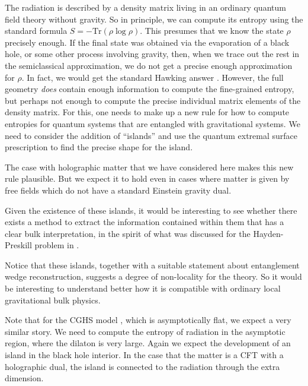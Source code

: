 \documentclass[12pt]{article}
\begin{document}
The radiation is described by a density matrix living in an ordinary quantum field theory without gravity. 
So in principle, we can compute its entropy using the standard formula $S = - \text{Tr}(\rho \log \rho)$. 
This presumes that we know the state $\rho$ precisely enough. 
If the final state was obtained via the evaporation of a black hole, or some other process involving gravity, then, when we trace out the rest in the semiclassical approximation, we do not get a precise enough approximation for $\rho$. 
In fact, we would get the standard Hawking answer \cite{Hawking:1976ra}. 
However, the full geometry {\it does} contain enough information to compute the fine-grained entropy, but perhaps not enough to compute the precise individual matrix elements of the density matrix. 
For this, one needs to make up a new rule for how to compute entropies for quantum systems that are entangled with gravitational systems. 
We need to consider the addition of ``islands'' and use the quantum extremal surface prescription  \cite{Ryu:2006bv,Hubeny:2007xt,Engelhardt:2014gca} to find the precise shape for the island. 
 
The case with holographic matter that we have considered here makes this new rule plausible. 
But we expect it to hold even in cases where matter is given by free fields which do not have a standard Einstein gravity dual. 

Given the existence of these islands, it would be interesting to see whether there exists a method   to extract the information contained within them that has a clear bulk interpretation, in the spirit of what was discussed for the Hayden-Preskill problem \cite{Hayden:2007cs} in \cite{Gao:2016bin,Maldacena:2017axo}.

Notice that these  islands, together with a suitable statement about entanglement wedge reconstruction, suggests a degree of non-locality for the theory. So it would be interesting to understand better how it is compatible with ordinary local gravitational bulk physics.

Note that for the CGHS model 
\cite{Callan:1992rs,Russo:1992ht,Russo:1992ax,Strominger:1994tn, Fiola:1994ir}, which is asymptotically flat,  we expect a very similar story. We need to compute the entropy of radiation in the asymptotic region, where the dilaton is very large. Again we expect the development of an island in the black hole interior. In the case that the matter is a CFT with a holographic dual, the island is connected to the radiation through the extra dimension. 
\end{document}
